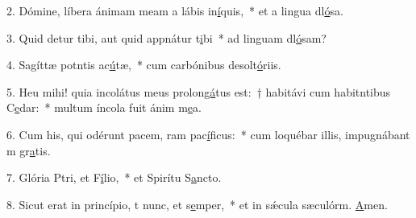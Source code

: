 2. Dómine, líbera ánimam meam a lábis in\uline{í}quis,~* et a lingua dl\uline{ó}sa.\par 
3. Quid detur tibi, aut quid appnátur t\uline{i}bi~* ad linguam dl\uline{ó}sam?\par 
4. Sagíttæ potntis ac\uline{ú}tæ,~* cum carbónibus desolt\uline{ó}riis.\par 
5. Heu mihi! quia incolátus meus prolon\uline{gá}tus est:~† habitávi cum habitntibus C\uline{e}dar:~* multum íncola fuit ánim m\uline{e}a.\par 
6. Cum his, qui odérunt pacem, ram pac\uline{í}ficus:~* cum loquébar illis, impugnábant m gr\uline{a}tis.\par 
7. Glória Ptri, et F\uline{í}lio,~* et Spirítu S\uline{a}ncto.\par 
8. Sicut erat in princípio, t nunc, et s\uline{e}mper,~* et in sǽcula sæculórm. \uline{A}men.\par 
